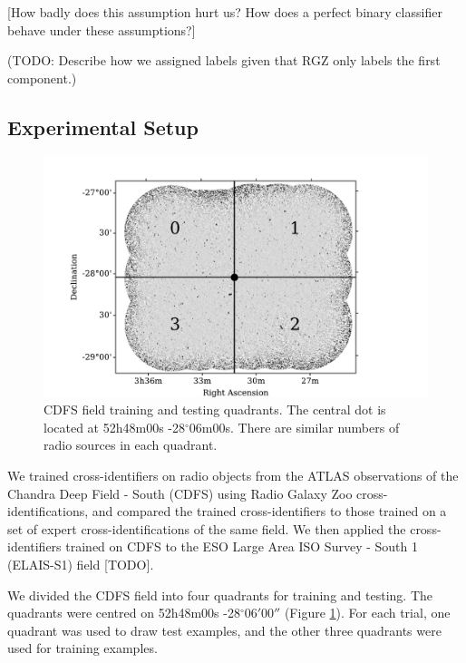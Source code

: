 \documentclass[fleqn,usenatbib,usedcolumn]{mnras}
\begin{document}
    {[}How badly does this assumption hurt us? How does a perfect binary
    classifier behave under these assumptions?{]}

    (TODO: Describe how we assigned labels given that RGZ only labels the
    first component.)

  \subsection{Experimental Setup}\label{experimental-setup}

    \begin{figure}
      \centering
      \includegraphics[width=\columnwidth]{images/quadrants.pdf}
      \caption{CDFS field training and testing quadrants. The central dot is
        located at 52h48m00s -28$^\circ$06m00s. There are similar numbers of
        radio sources in each quadrant.\label{fig:quadrants}}
    \end{figure}

    We trained cross-identifiers on radio objects from the ATLAS
    observations of the Chandra Deep Field - South (CDFS) using Radio Galaxy
    Zoo cross-identifications, and compared the trained cross-identifiers to
    those trained on a set of expert cross-identifications of the same
    field. We then applied the cross-identifiers trained on CDFS to the ESO
    Large Area ISO Survey - South 1 (ELAIS-S1) field {[}TODO{]}.

    We divided the CDFS field into four quadrants for training and testing.
    The quadrants were centred on 52h48m00s -28$^\circ$06$'$00$''$
    (Figure \ref{fig:quadrants}). For each trial, one quadrant
    was used to draw test examples, and the other three quadrants were used
    for training examples.
\end{document}
